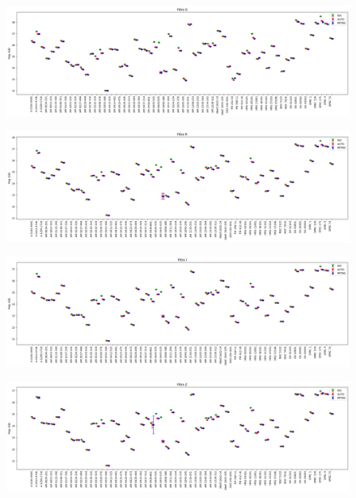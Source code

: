 \begin{anexosenv}
    \begin{figure}[h]
        \centering
        \includegraphics[width=1.0\textwidth]{Imagens/galaxias_horizontal_g.png}
        \caption[]{}
        \label{fig:galaxias_horizontal_g} 
    \end{figure}

    \begin{figure}[h]
        \centering
        \includegraphics[width=1.0\textwidth]{Imagens/galaxias_horizontal_r.png}
        \caption[]{}
        \label{fig:galaxias_horizontal_r} 
    \end{figure}

    \begin{figure}[h]
        \centering
        \includegraphics[width=1.0\textwidth]{Imagens/galaxias_horizontal_i.png}
        \caption[]{}
        \label{fig:galaxias_horizontal_i} 
    \end{figure}

    \begin{figure}[h]
        \centering
        \includegraphics[width=1.0\textwidth]{Imagens/galaxias_horizontal_z.png}
        \caption[]{}
        \label{fig:galaxias_horizontal_z} 
    \end{figure}


\end{anexosenv}
